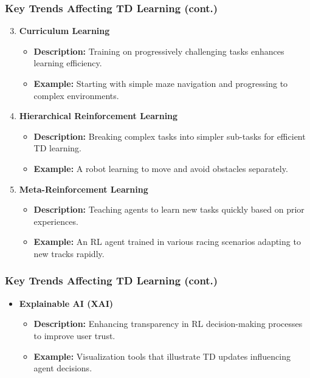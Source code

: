 \documentclass[aspectratio=169]{beamer}
\begin{document}
\begin{frame}[fragile]
    \frametitle{Key Trends Affecting TD Learning (cont.)}
    \begin{enumerate}
        \setcounter{enumi}{2}
        \item \textbf{Curriculum Learning}
            \begin{itemize}
                \item \textbf{Description:} Training on progressively challenging tasks enhances learning efficiency.
                \item \textbf{Example:} Starting with simple maze navigation and progressing to complex environments.
            \end{itemize}

        \item \textbf{Hierarchical Reinforcement Learning}
            \begin{itemize}
                \item \textbf{Description:} Breaking complex tasks into simpler sub-tasks for efficient TD learning.
                \item \textbf{Example:} A robot learning to move and avoid obstacles separately.
            \end{itemize}
        
        \item \textbf{Meta-Reinforcement Learning}
            \begin{itemize}
                \item \textbf{Description:} Teaching agents to learn new tasks quickly based on prior experiences.
                \item \textbf{Example:} An RL agent trained in various racing scenarios adapting to new tracks rapidly.
            \end{itemize}
    \end{enumerate}
\end{frame}

\begin{frame}[fragile]
    \frametitle{Key Trends Affecting TD Learning (cont.)}
    \begin{itemize}
        \item \textbf{Explainable AI (XAI)}
            \begin{itemize}
                \item \textbf{Description:} Enhancing transparency in RL decision-making processes to improve user trust.
                \item \textbf{Example:} Visualization tools that illustrate TD updates influencing agent decisions.
            \end{itemize}
    \end{itemize}
\end{frame}
\end{document}

